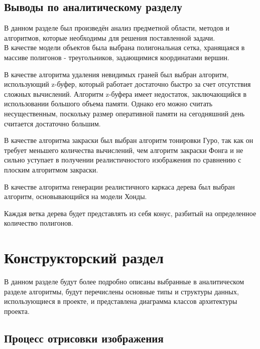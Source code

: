 \documentclass[54pt, a4paper]{article}
\begin{document}
	\subsection{Выводы по аналитическому разделу}
	В данном разделе был произведён анализ предметной области, методов и
	алгоритмов, которые необходимы для решения поставленной задачи.\\

	В качестве модели объектов была выбрана полигональная сетка, хранящаяся в массиве полигонов - треугольников, задающимися координатами вершин.
	
	В качестве алгоритма удаления невидимых граней был выбран алгоритм,
	использующий z-буфер, который работает достаточно быстро за счет отсутствия сложных вычислений. Алгоритм z-буфера имеет недостаток, заключающийся в использовании большого объема памяти. Однако его можно считать несущественным, поскольку размер оперативной памяти на сегодняшний день считается достаточно большим.
	
	В качестве алгоритма закраски был выбран алгоритм тонировки Гуро, так как он требует меньшего количества вычислений, чем алгоритм закраски Фонга и не сильно уступает в получении реалистичностого изображения по сравнению с плоским алгоритмом закраски.
	
	В качестве алгоритма генерации реалистичного каркаса дерева был выбран алгоритм, основывающийся на модели Хонды. 
	
	Каждая ветка дерева будет представлять из себя конус, разбитый на определенное количество полигонов.
	
	
	\newpage
	\section{Конструкторский раздел}
	В данном разделе будут более подробно описаны выбранные в аналитическом разделе алгоритмы, будут перечислены основные типы и структуры данных, использующиеся в проекте, и представлена диаграмма классов архитектуры проекта.
	\subsection{Процесс отрисовки изображения}
\end{document}
